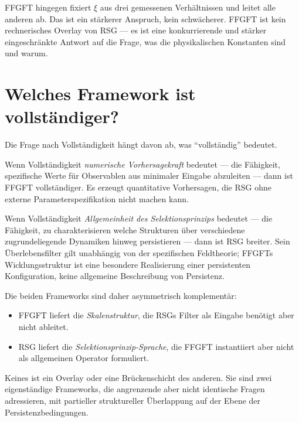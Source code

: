 FFGFT hingegen fixiert $\xi$ aus drei gemessenen Verhältnissen und leitet
alle anderen ab. Das ist ein stärkerer Anspruch, kein schwächerer. FFGFT
ist kein rechnerisches Overlay von RSG — es ist eine konkurrierende und
stärker eingeschränkte Antwort auf die Frage, was die physikalischen
Konstanten sind und warum.

\section{Welches Framework ist vollständiger?}

Die Frage nach Vollständigkeit hängt davon ab, was ``vollständig'' bedeutet.

Wenn Vollständigkeit \emph{numerische Vorhersagekraft} bedeutet — die
Fähigkeit, spezifische Werte für Observablen aus minimaler Eingabe
abzuleiten — dann ist FFGFT vollständiger. Es erzeugt quantitative
Vorhersagen, die RSG ohne externe Parameterspezifikation nicht machen kann.

Wenn Vollständigkeit \emph{Allgemeinheit des Selektionsprinzips} bedeutet
— die Fähigkeit, zu charakterisieren welche Strukturen über verschiedene
zugrundeliegende Dynamiken hinweg persistieren — dann ist RSG breiter.
Sein Überlebensfilter gilt unabhängig von der spezifischen Feldtheorie;
FFGFTs Wicklungsstruktur ist eine besondere Realisierung einer persistenten
Konfiguration, keine allgemeine Beschreibung von Persistenz.

Die beiden Frameworks sind daher asymmetrisch komplementär:

\begin{itemize}
  \item FFGFT liefert die \emph{Skalenstruktur}, die RSGs Filter als Eingabe
        benötigt aber nicht ableitet.
  \item RSG liefert die \emph{Selektionsprinzip-Sprache}, die FFGFT
        instantiiert aber nicht als allgemeinen Operator formuliert.
\end{itemize}

Keines ist ein Overlay oder eine Brückenschicht des anderen. Sie sind
zwei eigenständige Frameworks, die angrenzende aber nicht identische
Fragen adressieren, mit partieller struktureller Überlappung auf der
Ebene der Persistenzbedingungen.

